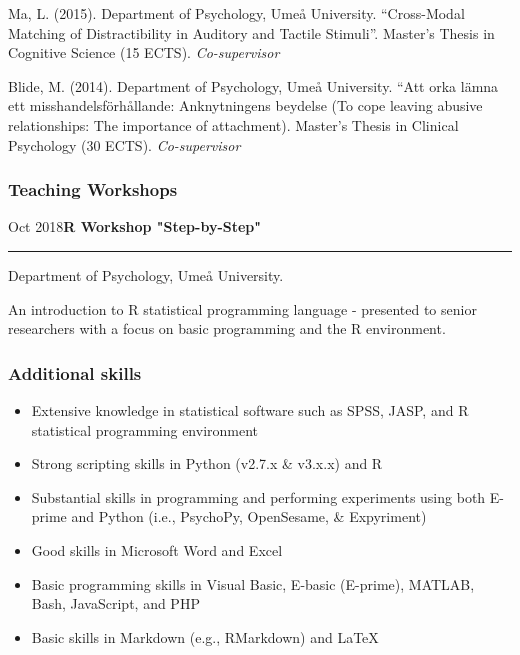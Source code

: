 \documentclass[]{article}
\providecommand{\tightlist}{%
  \setlength{\itemsep}{0pt}\setlength{\parskip}{0pt}}
\begin{document}
Ma, L. (2015). Department of Psychology, Umeå University. ``Cross-Modal
Matching of Distractibility in Auditory and Tactile Stimuli''. Master's
Thesis in Cognitive Science (15 ECTS). \emph{Co-supervisor}

Blide, M. (2014). Department of Psychology, Umeå University. ``Att orka
lämna ett misshandelsförhållande: Anknytningens beydelse (To cope
leaving abusive relationships: The importance of attachment). Master's
Thesis in Clinical Psychology (30 ECTS). \emph{Co-supervisor}

\subsubsection{Teaching Workshops}\label{teaching-workshops}

Oct 2018\hspace{0.75cm}\textbf{R Workshop "Step-by-Step"}\vspace{1mm}

\hrule
\begin{changemargin}{2.15cm}{2.4cm}


Department of Psychology, Umeå University.

An introduction to R statistical programming language - presented to senior researchers with a focus on basic programming and the R environment.

\end{changemargin}

\subsubsection{Additional skills}\label{additional-skills}

\begin{itemize}
\tightlist
\item
  Extensive knowledge in statistical software such as SPSS, JASP, and R
  statistical programming environment
\item
  Strong scripting skills in Python (v2.7.x \& v3.x.x) and R
\item
  Substantial skills in programming and performing experiments using
  both E-prime and Python (i.e., PsychoPy, OpenSesame, \& Expyriment)
\item
  Good skills in Microsoft Word and Excel
\item
  Basic programming skills in Visual Basic, E-basic (E-prime), MATLAB,
  Bash, JavaScript, and PHP
\item
  Basic skills in Markdown (e.g., RMarkdown) and \LaTeX
\end{itemize}
\end{document}
